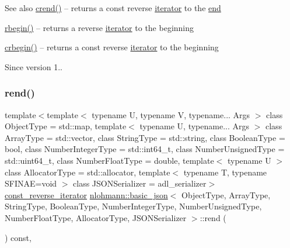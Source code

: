 \begin{DoxySeeAlso}{See also}
\mbox{\hyperlink{classnlohmann_1_1basic__json_a5795b029dbf28e0cb2c7a439ec5d0a88}{crend()}} -- returns a const reverse \mbox{\hyperlink{classnlohmann_1_1basic__json_a099316232c76c034030a38faa6e34dca}{iterator}} to the \mbox{\hyperlink{classnlohmann_1_1basic__json_a13e032a02a7fd8a93fdddc2fcbc4763c}{end}} 

\mbox{\hyperlink{classnlohmann_1_1basic__json_a1ef93e2006dbe52667294f5ef38b0b10}{rbegin()}} -- returns a reverse \mbox{\hyperlink{classnlohmann_1_1basic__json_a099316232c76c034030a38faa6e34dca}{iterator}} to the beginning 

\mbox{\hyperlink{classnlohmann_1_1basic__json_a1e0769d22d54573f294da0e5c6abc9de}{crbegin()}} -- returns a const reverse \mbox{\hyperlink{classnlohmann_1_1basic__json_a099316232c76c034030a38faa6e34dca}{iterator}} to the beginning
\end{DoxySeeAlso}
\begin{DoxySince}{Since}
version 1.. 
\end{DoxySince}
\mbox{\label{classnlohmann_1_1basic__json_a4f73d4cee67ea328d785979c22af0ae1}} 
\subsubsection{\texorpdfstring{rend()}{rend()}\hspace{0.1cm}{\footnotesize\ttfamily [2/2]}}
{\footnotesize\ttfamily template$<$template$<$ typename U, typename V, typename... Args $>$ class Object\+Type = std\+::map, template$<$ typename U, typename... Args $>$ class Array\+Type = std\+::vector, class String\+Type  = std\+::string, class Boolean\+Type  = bool, class Number\+Integer\+Type  = std\+::int64\+\_\+t, class Number\+Unsigned\+Type  = std\+::uint64\+\_\+t, class Number\+Float\+Type  = double, template$<$ typename U $>$ class Allocator\+Type = std\+::allocator, template$<$ typename T, typename S\+F\+I\+N\+A\+E=void $>$ class J\+S\+O\+N\+Serializer = adl\+\_\+serializer$>$ \\
\mbox{\hyperlink{classnlohmann_1_1basic__json_a72be3c24bfa24f0993d6c11af03e7404}{const\+\_\+reverse\+\_\+iterator}} \mbox{\hyperlink{classnlohmann_1_1basic__json}{nlohmann\+::basic\+\_\+json}}$<$ Object\+Type, Array\+Type, String\+Type, Boolean\+Type, Number\+Integer\+Type, Number\+Unsigned\+Type, Number\+Float\+Type, Allocator\+Type, J\+S\+O\+N\+Serializer $>$\+::rend (\begin{DoxyParamCaption}{ }\end{DoxyParamCaption}) const\hspace{0.3cm}{\ttfamily [inline]}, {\ttfamily [noexcept]}}



